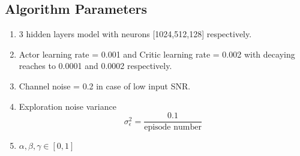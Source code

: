 \subsection{Algorithm Parameters}
\begin{enumerate}
    \item 3 hidden layers model with neurons [1024,512,128] respectively.
    \item Actor learning rate = 0.001 and Critic learning rate = 0.002 with decaying reaches to 0.0001 and 0.0002 respectively.
    \item Channel noise = 0.2 in case of low input SNR.
    \item Exploration noise variance \[ \sigma^2_\epsilon = \frac{0.1}{\text{episode number}} \]
    \item $\alpha, \beta, \gamma \in [0,1]$
\end{enumerate}
